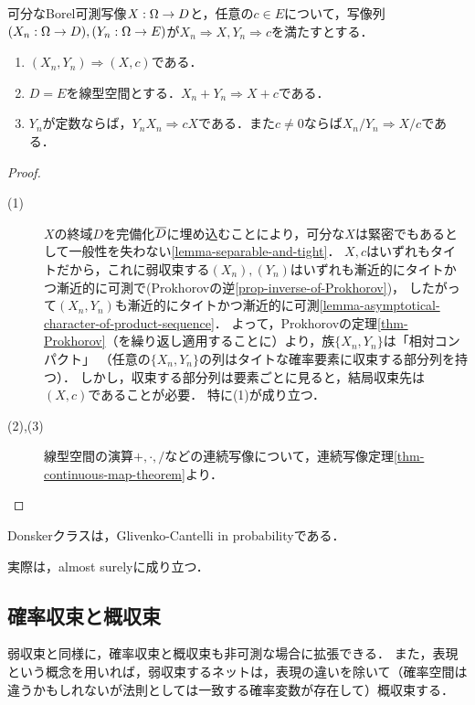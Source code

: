 \documentclass[uplatex,dvipdfmx]{jsreport}
\begin{document}
\begin{theorem}[Slutsky]
    可分なBorel可測写像$X:\Omega\to D$と，任意の$c\in E$について，写像列$(X_n:\Omega\to D),(Y_n:\Omega\to E)$が$X_n\Rightarrow X,Y_n\Rightarrow c$を満たすとする．
    \begin{enumerate}
        \item $(X_n,Y_n)\Rightarrow(X,c)$である．
        \item $D=E$を線型空間とする．$X_n+Y_n\Rightarrow X+c$である．
        \item $Y_n$が定数ならば，$Y_nX_n\Rightarrow cX$である．また$c\ne 0$ならば$X_n/Y_n\Rightarrow X/c$である．
    \end{enumerate}
\end{theorem}
\begin{proof}\mbox{}
    \begin{description}
        \item[(1)] $X$の終域$D$を完備化$\overline{D}$に埋め込むことにより，可分な$X$は緊密でもあるとして一般性を失わない\ref{lemma-separable-and-tight}．
        $X,c$はいずれもタイトだから，これに弱収束する$(X_n),(Y_n)$はいずれも漸近的にタイトかつ漸近的に可測で(Prokhorovの逆\ref{prop-inverse-of-Prokhorov})，
        したがって$(X_n,Y_n)$も漸近的にタイトかつ漸近的に可測\ref{lemma-asymptotical-character-of-product-sequence}．
        よって，Prokhorovの定理\ref{thm-Prokhorov}（を繰り返し適用することに）より，族$\{X_n,Y_n\}$は「相対コンパクト」
        （任意の$\{X_n,Y_n\}$の列はタイトな確率要素に収束する部分列を持つ）．
        しかし，収束する部分列は要素ごとに見ると，結局収束先は$(X,c)$であることが必要．
        特に(1)が成り立つ．
        \item[(2),(3)]
        線型空間の演算$+,\cdot,/$などの連続写像について，連続写像定理\ref{thm-continuous-map-theorem}より．
    \end{description}
\end{proof}

\begin{corollary}
    Donskerクラスは，Glivenko-Cantelli in probabilityである．
\end{corollary}
\begin{remarks}
    実際は，almost surelyに成り立つ．
\end{remarks}

\subsection{確率収束と概収束}

\begin{tcolorbox}[colframe=ForestGreen, colback=ForestGreen!10!white,breakable,colbacktitle=ForestGreen!40!white,coltitle=black,fonttitle=\bfseries\sffamily,
title=]
    弱収束と同様に，確率収束と概収束も非可測な場合に拡張できる．
    また，表現という概念を用いれば，弱収束するネットは，表現の違いを除いて（確率空間は違うかもしれないが法則としては一致する確率変数が存在して）概収束する．
\end{tcolorbox}
\end{document}
